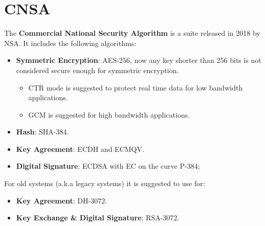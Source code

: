 \section{CNSA}
The \textbf{Commercial National Security Algorithm} is a suite released in 2018 by NSA. It includes the following algorithms:
\begin{itemize}
    \item \textbf{Symmetric Encryption}: AES-256, now any key shorter than 256 bits is not considered secure enough for symmetric encryption.
    \begin{itemize}
        \item CTR mode is suggested to protect real time data for low bandwidth applications.
        \item GCM is suggested for high bandwidth applications.
    \end{itemize}
    \item \textbf{Hash}: SHA-384.
    \item \textbf{Key Agreement}: ECDH and ECMQV.
    \item \textbf{Digital Signature}: ECDSA with EC on the curve P-384;
\end{itemize}
For old systems (a.k.a legacy systems) it is suggested to use for:
\begin{itemize}
    \item \textbf{Key Agreement}: DH-3072.
    \item \textbf{Key Exchange \& Digital Signature}: RSA-3072.
\end{itemize}

